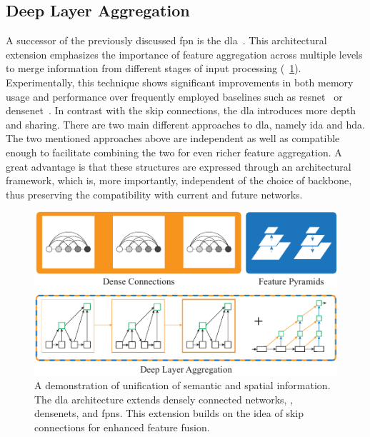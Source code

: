 \subsection{Deep Layer Aggregation}
\label{ssec:DeepLayerAggregation}


A successor of the previously discussed \gls{fpn} is the \gls{dla}~\cite{yu2019dla}. This architectural extension emphasizes the importance of feature aggregation across multiple levels to merge information from different stages of input processing (\figtext{}~\ref{fig:DLAMotivation}). Experimentally, this technique shows significant improvements in both memory usage and performance over frequently employed baselines such as \gls{resnet}~\cite{he2015resnet} or \gls{densenet}~\cite{huang2018densenet}. In contrast with the skip connections, the \gls{dla} introduces more depth and sharing. There are two main different approaches to \gls{dla}, namely \gls{ida} and \gls{hda}. The two mentioned approaches above are independent as well as compatible enough to facilitate combining the two for even richer feature aggregation. A great advantage is that these structures are expressed through an architectural framework, which is, more importantly, independent of the choice of backbone, thus preserving the compatibility with current and future networks.

\begin{figure}[t]
    \centerline{\includegraphics[width=0.75\linewidth]{figures/theoretical_foundations/dla_comparison.pdf}}
    \caption[\Gls{dla} comparison]{A demonstration of unification of semantic and spatial information. The \gls{dla} architecture extends densely connected networks, \ietext{}, \glspl{densenet}, and \glspl{fpn}. This extension builds on the idea of skip connections for enhanced feature fusion. }
    \label{fig:DLAMotivation}
\end{figure}

